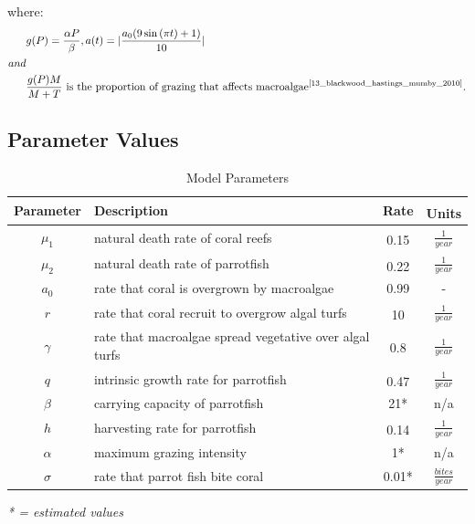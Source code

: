 \documentclass[12pt]{article}
\begin{document}
where: 
\begin{align*}
&g(P) = \frac{\alpha P}{\beta}, a(t)=|\frac{a_{0}(9\sin{(\pi t) }+1)}{10}|\\
and\\
&\frac{g(P)M}{M + T} \text{ is the proportion of grazing that affects macroalgae} \textsuperscript{\cite{13_blackwood_hastings_mumby_2010}}.
\end{align*}


\subsection{Parameter Values}
\begin{table}[H]
    \centering
    \begin{tabular}{c p{9cm} c c}
        \hline
        Parameter & Description & Rate & Units\textsuperscript{\cite{12_noaa_report}\cite{04_mathanalysis}\cite{13_blackwood_hastings_mumby_2010}}\\
        \hline
        \hline
        $\mu_{1}$ & natural death rate of coral reefs & 0.15\textsuperscript{\cite{16_wolanski_richmond_mccook_2004}} & $\frac{1}{year}$\\ %
        $\mu_{2}$ & natural death rate of parrotfish & 0.22\textsuperscript{\cite{12_noaa_report}} & $\frac{1}{year}$\\ %
        $a_{0}$ & rate that coral is overgrown by macroalgae & 0.99 & - \\
        $r$ & rate that coral recruit to overgrow algal turfs & 10\textsuperscript{\cite{16_wolanski_richmond_mccook_2004}} & $\frac{1}{year}$\\ %
        $\gamma$ & rate that macroalgae spread vegetative over algal turfs & 0.8\textsuperscript{\cite{11_zikkah_anggriani_supriatna_2020}} & $\frac{1}{year}$\\ %
        $q$ & intrinsic growth rate for parrotfish & 0.47\textsuperscript{\cite{12_noaa_report}} & $\frac{1}{year}$\\ %
        $\beta$ & carrying capacity of parrotfish & 21* & n/a\\
        $h$ & harvesting rate for parrotfish & 0.14\textsuperscript{\cite{12_noaa_report}} & $\frac{1}{year}$\\ %
        $\alpha$ & maximum grazing intensity & 1* & n/a\\
        $\sigma$ & rate that parrot fish bite coral & 0.01*& $\frac{bites}{year}$\\
        \hline
    \end{tabular}
    \caption{Model Parameters}
    \label{tab:my_label}
\end{table}
\textit{* = estimated values}
\end{document}
